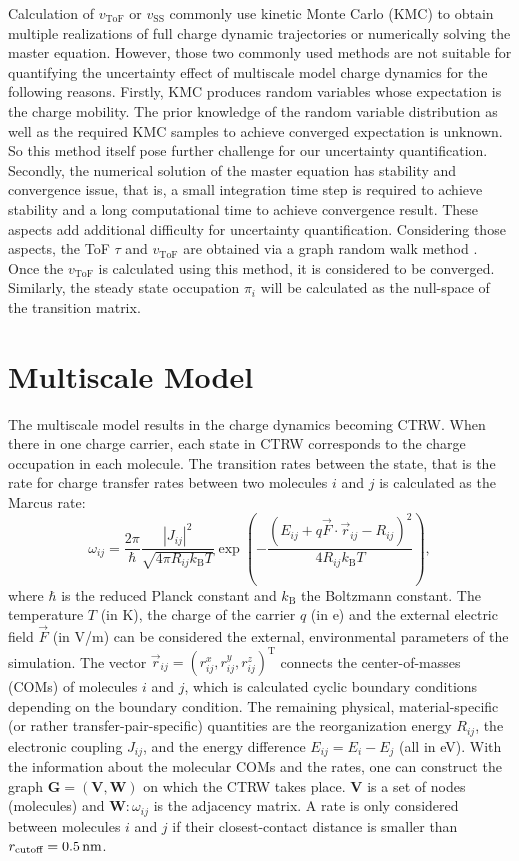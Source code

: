 \documentclass[letterpaper,12pt]{article}
\begin{document}
Calculation of $v_\text{ToF}$ or $v_\text{SS}$ commonly use kinetic Monte Carlo (KMC) to obtain multiple realizations of full charge dynamic trajectories 
or numerically solving the master equation. 
However, those two commonly used methods are not suitable for quantifying the uncertainty effect of multiscale model charge dynamics for the following reasons. 
Firstly, KMC produces random variables whose expectation is the charge mobility. The prior knowledge of the random variable distribution as well as the required KMC samples to achieve converged expectation is unknown. So this method itself pose further challenge for our uncertainty quantification. 
Secondly, the numerical solution of the master equation has stability and convergence issue, that is, a small integration time step is required to achieve stability and a long computational time to achieve convergence result. These aspects add additional difficulty for uncertainty quantification. 
Considering those aspects, the ToF $\tau$ and $v_\text{ToF}$ are obtained via a graph random walk method
\cite{chen_graph_2024}. Once the $v_\text{ToF}$ is calculated using this method, it is considered to be converged. 
Similarly, the steady state occupation $\pi_i$ will be calculated as the null-space of the transition matrix. 

\section{Multiscale Model}
The multiscale model results in the charge dynamics becoming CTRW. When there in one charge carrier, each state in CTRW corresponds to the charge occupation in each molecule. The transition rates between the state, that is the rate for charge transfer rates between two molecules $i$ and $j$ is calculated as the Marcus rate:
%
\begin{equation}
    \omega_{ij} = \frac{2\pi}{\hbar} \frac{|J_{ij}|^2}{\sqrt{4\pi R_{ij} k_\text{B}T}} \exp\left(-\frac{(E_{ij} + q \vec{F} \cdot \vec{r}_{ij} - R_{ij})^2}{4R_{ij} k_\text{B}T}\right) ,
    \label{equ:Marcus}
\end{equation}
%
where $\hbar$ is the reduced Planck constant and $k_\text{B}$ the Boltzmann constant. The temperature $T$ (in \unit[]{K}), the charge of the carrier $q$ (in \unit[]{e}) and the external electric field $\vec{F}$ (in V/m) can be considered the external, environmental parameters of the simulation. The vector $\vec{r}_{ij} = (r^x_{ij},r^y_{ij},r^z_{ij})^\text{T}$ connects the center-of-masses (COMs) of molecules $i$ and $j$, which is calculated cyclic boundary conditions depending on the boundary condition. The remaining physical, material-specific (or rather transfer-pair-specific) quantities are the reorganization energy $R_{ij}$, the electronic coupling $J_{ij}$, and the energy difference $E_{ij} = E_i - E_j$ (all in \unit[]{eV}). With the information about the molecular COMs and the rates, one can construct the graph $\mathbf{G}=(\mathbf{V}, \mathbf{W})$ on which the CTRW takes place. $\mathbf{V}$ is a set of nodes (molecules) and $\mathbf{W}: \omega_{ij}$ is the adjacency matrix. A rate is only considered between molecules $i$ and $j$ if their closest-contact distance is smaller than $r_\text{cutoff}=\unit[0.5]{nm}$.
\end{document}
